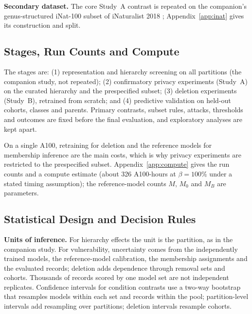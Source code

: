 \documentclass{article} %
\begin{document}
\textbf{Secondary dataset.} The core Study~A contrast is repeated on the companion's genus-structured iNat-100 subset of iNaturalist 2018 \citep{vanhorn2018inat}; Appendix~\ref{app:inat} gives its construction and split.

\subsection{Stages, Run Counts and Compute}
\label{sec:stages}

The stages are: (1) representation and hierarchy screening on all partitions (the companion study, not repeated); (2) confirmatory privacy experiments (Study~A) on the curated hierarchy and the prespecified subset; (3) deletion experiments (Study~B), retrained from scratch; and (4) predictive validation on held-out cohorts, classes and parents. Primary contrasts, subset rules, attacks, thresholds and outcomes are fixed before the final evaluation, and exploratory analyses are kept apart.



On a single A100, retraining for deletion and the reference models for membership inference are the main costs, which is why privacy experiments are restricted to the prespecified subset. Appendix~\ref{app:compute} gives the run counts and a compute estimate (about 326 A100-hours at $\beta=100\%$ under a stated timing assumption); the reference-model counts $M$, $M_0$ and $M_B$ are parameters.

\subsection{Statistical Design and Decision Rules}
\label{sec:stats}

\textbf{Units of inference.} For hierarchy effects the unit is the partition, as in the companion study. For vulnerability, uncertainty comes from the independently trained models, the reference-model calibration, the membership assignments and the evaluated records; deletion adds dependence through removal sets and cohorts. Thousands of records scored by one model set are not independent replicates. Confidence intervals for condition contrasts use a two-way bootstrap that resamples models within each set and records within the pool; partition-level intervals add resampling over partitions; deletion intervals resample cohorts.
\end{document}

